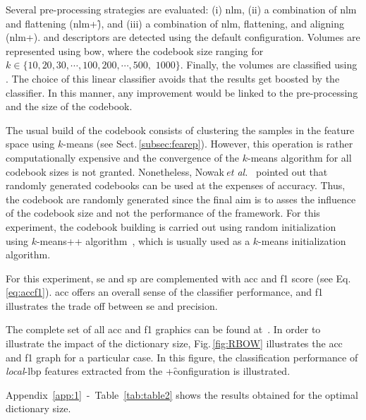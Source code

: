 
Several pre-processing strategies are evaluated: (i) \ac{nlm}, (ii) a combination of \ac{nlm} and flattening (\ac{nlm}+\f), and (iii) a combination of \ac{nlm}, flattening, and aligning (\ac{nlm}+\fal).
\lbp and \lbptop descriptors are detected using the default configuration.
Volumes are represented using \ac{bow}, where the codebook size ranging for $k\in \{10, 20, 30, \cdots, 100, 200, \cdots, 500,$ $1000\}$.
Finally, the volumes are classified using \lr.
The choice of this linear classifier avoids that the results get boosted by the classifier.
In this manner, any improvement would be linked to the pre-processing and the size of the codebook.
%

The usual build of the codebook consists of clustering the samples in the feature space using $k$-means (see Sect.\,\ref{subsec:fearep}).
However, this operation is rather computationally expensive and the convergence of the $k$-means algorithm for all codebook sizes is not granted.
Nonetheless, Nowak\,\textit{et al.}~\cite{nowak2006sampling} pointed out that randomly generated codebooks can be used at the expenses of accuracy.
Thus, the codebook are randomly generated since the final aim is to asses the influence of the codebook size and not the performance of the framework.
For this experiment, the codebook building is carried out using random initialization using $k$-means++ algorithm~\cite{arthur2007k}, which is usually used as a $k$-means initialization algorithm.

For this experiment, \ac{se} and \ac{sp} are complemented with \ac{acc} and \ac{f1} score (see Eq.\,\eqref{eq:accf1}).
\ac{acc} offers an overall sense of the classifier performance, and \ac{f1} illustrates the trade off between \ac{se} and precision.

The complete set of all \ac{acc} and \ac{f1} graphics can be found at~\cite{Lemaitre2015}.
In order to illustrate the impact of the dictionary size, Fig.\,\ref{fig:RBOW} illustrates the \ac{acc} and \ac{f1} graph for a particular case.
In this figure, the classification performance of \emph{local}-\ac{lbp} features extracted from the \nlm+\f configuration is illustrated. 

Appendix~\ref{app:1}~-~Table~\ref{tab:table2} shows the results obtained for the optimal dictionary size.

